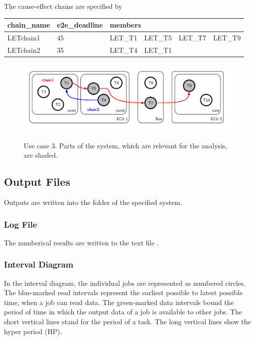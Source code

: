 The cause-effect chains are specified by
\begin{center}
	\begin{tabular}{|l|l|l|l|l|l|} \hline
		\textbf{chain\_name} 
		& \textbf{e2e\_deadline}
		& \multicolumn{4}{|l|}{\textbf{members}} \\ \hline	
		LETchain1 & 45 &LET\_T1 &LET\_T5 &LET\_T7 &LET\_T9 \\ \hline	
		LETchain2 & 35 &LET\_T4 &LET\_T1 & &\\ \hline			 
	\end{tabular}
\end{center}
%
\begin{figure}[h!]
	\centering
		\includegraphics[height=4cm, trim = 0.5cm 0.5cm 0.5cm 0.5cm]{fig/let-system.pdf}
	\caption{Use case 3. Parts of the system, which are relevant for the analysis, are shaded.}
	\label{fig:use-case-3}
\end{figure}
\FloatBarrier
\hfill
\pagebreak[4]


\newpage
\subsection{Output Files}
\label{sec:output-files}
Outputs are written into the folder of the specified system.

\subsubsection{Log File}
The numberical results are written to the text file 
.

\subsubsection{Interval Diagram}
In the interval diagram, the individual jobs are represented as numbered circles. 
The blue-marked read intervals represent the earliest possible to latest possible time, when a job can read data. 
The green-marked data intervals bound the period of time in which the output data of a job is available to other jobs.
The short vertical lines stand for the period of a task.
The long vertical lines show the hyper period (HP).
\smallskip

